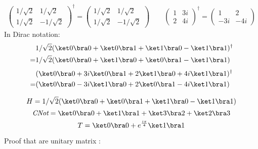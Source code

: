 
\begin{align*}
\left(\begin{array}{cc}
 1/\sqrt{2}& 1/\sqrt{2}\\
 1/\sqrt{2}& -1/\sqrt{2}
\end{array}\right)^\dagger
=
\left(\begin{array}{cc}
 1/\sqrt{2}& 1/\sqrt{2}\\
 1/\sqrt{2}& -1/\sqrt{2}
\end{array}\right)
\qquad
\left(\begin{array}{cc}
 1& 3i\\
 2& 4i
\end{array}\right)^\dagger
=
\left(\begin{array}{cc}
 1& 2\\
 -3i& -4i
\end{array}\right)
\end{align*}
In Dirac notation:
\begin{align*}
  &1/\sqrt 2 (\ket 0 \bra 0 + \ket 0 \bra 1 + \ket 1 \bra 0 - \ket 1 \bra
    1)^\dagger \\
  =&1/\sqrt 2 (\ket 0 \bra 0 + \ket 1 \bra 0 + \ket 0 \bra 1 - \ket 1 \bra 1)
\end{align*}
\begin{align*}
  &(\ket 0 \bra 0 + 3i \ket 0 \bra 1 + 2 \ket 1 \bra 0 + 4i \ket 1 \bra
    1)^\dagger \\
  =&(\ket 0 \bra 0 - 3i \ket 1 \bra 0 + 2 \ket 0 \bra 1 - 4i \ket 1 \bra
    1)
\end{align*}


$$ H = 1/\sqrt 2 (\ket 0 \bra 0+\ket 0 \bra 1+\ket 1 \bra 0-\ket 1 \bra 1)$$
$$ \textit{CNot} = \ket 0 \bra 0+\ket 1 \bra 1+\ket 3 \bra 2+\ket 2 \bra 3$$
$$ T = \ket 0 \bra 0 + e^{\frac{i\pi}{4}} \ket 1 \bra 1$$

Proof that are unitary matrix :

